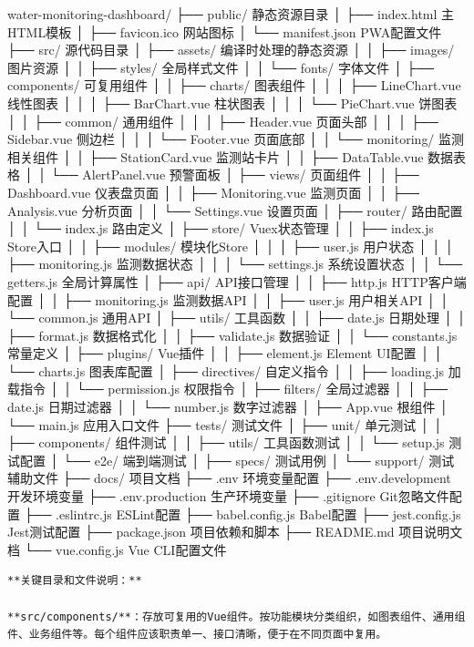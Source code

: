 {{water-monitoring-dashboard/ ├── public/  静态资源目录 │ ├── index.html  主HTML模板 │ ├── favicon.ico  网站图标 │ └── manifest.json  PWA配置文件 ├── src/  源代码目录 │ ├── assets/  编译时处理的静态资源 │ │ ├── images/  图片资源 │ │ ├── styles/  全局样式文件 │ │ └── fonts/  字体文件 │ ├── components/  可复用组件 │ │ ├── charts/  图表组件 │ │ │ ├── LineChart.vue  线性图表 │ │ │ ├── BarChart.vue  柱状图表 │ │ │ └── PieChart.vue  饼图表 │ │ ├── common/  通用组件 │ │ │ ├── Header.vue  页面头部 │ │ │ ├── Sidebar.vue  侧边栏 │ │ │ └── Footer.vue  页面底部 │ │ └── monitoring/  监测相关组件 │ │ ├── StationCard.vue  监测站卡片 │ │ ├── DataTable.vue  数据表格 │ │ └── AlertPanel.vue  预警面板 │ ├── views/  页面组件 │ │ ├── Dashboard.vue  仪表盘页面 │ │ ├── Monitoring.vue  监测页面 │ │ ├── Analysis.vue  分析页面 │ │ └── Settings.vue  设置页面 │ ├── router/  路由配置 │ │ └── index.js  路由定义 │ ├── store/  Vuex状态管理 │ │ ├── index.js  Store入口 │ │ ├── modules/  模块化Store │ │ │ ├── user.js  用户状态 │ │ │ ├── monitoring.js  监测数据状态 │ │ │ └── settings.js  系统设置状态 │ │ └── getters.js  全局计算属性 │ ├── api/  API接口管理 │ │ ├── http.js  HTTP客户端配置 │ │ ├── monitoring.js  监测数据API │ │ ├── user.js  用户相关API │ │ └── common.js  通用API │ ├── utils/  工具函数 │ │ ├── date.js  日期处理 │ │ ├── format.js  数据格式化 │ │ ├── validate.js  数据验证 │ │ └── constants.js  常量定义 │ ├── plugins/  Vue插件 │ │ ├── element.js  Element UI配置 │ │ └── charts.js  图表库配置 │ ├── directives/  自定义指令 │ │ ├── loading.js  加载指令 │ │ └── permission.js  权限指令 │ ├── filters/  全局过滤器 │ │ ├── date.js  日期过滤器 │ │ └── number.js  数字过滤器 │ ├── App.vue  根组件 │ └── main.js  应用入口文件 ├── tests/  测试文件 │ ├── unit/  单元测试 │ │ ├── components/  组件测试 │ │ ├── utils/  工具函数测试 │ │ └── setup.js  测试配置 │ └── e2e/  端到端测试 │ ├── specs/  测试用例 │ └── support/  测试辅助文件 ├── docs/  项目文档 ├── .env  环境变量配置 ├── .env.development  开发环境变量 ├── .env.production  生产环境变量 ├── .gitignore  Git忽略文件配置 ├── .eslintrc.js  ESLint配置 ├── babel.config.js  Babel配置 ├── jest.config.js  Jest测试配置 ├── package.json  项目依赖和脚本 ├── README.md  项目说明文档 └── vue.config.js  Vue CLI配置文件

\begin{lstlisting}
**关键目录和文件说明：**

**src/components/**：存放可复用的Vue组件。按功能模块分类组织，如图表组件、通用组件、业务组件等。每个组件应该职责单一、接口清晰，便于在不同页面中复用。


\end{lstlisting}}}
